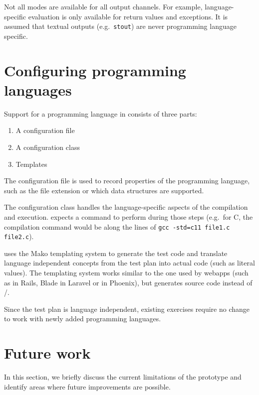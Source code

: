 \documentclass[5p,number]{elsarticle}
\begin{document}
    Not all modes are available for all output channels.
    For example, language-specific evaluation is only available for return values and exceptions.
    It is assumed that textual outputs (e.g.\ \texttt{stout}) are never programming language specific.

    \section{Configuring programming languages}\label{sec:configuring-programming-languages}

    Support for a programming language in \tested{} consists of three parts:

    \begin{enumerate}
        \item A configuration file
        \item A configuration class
        \item Templates
    \end{enumerate}

    The configuration file is used to record properties of the programming language, such as the file extension or which data structures are supported.

    The configuration class handles the language-specific aspects of the compilation and execution.
    \tested{} expects a command to perform during those steps (e.g.\ for C, the compilation command would be along the lines of \texttt{gcc -std=c11 file1.c file2.c}).
    
    \tested{} uses the Mako templating system \cite{mako} to generate the test code and translate language independent concepts from the test plan into actual code (such as literal values).
    The templating system works similar to the one used by webapps (such as  in Rails, Blade in Laravel or  in Phoenix), but generates source code instead of /.
    
    Since the test plan is language independent, existing exercises require no change to work with newly added programming languages.
    
    \section{Future work}\label{sec:future-work}
    
    In this section, we briefly discuss the current limitations of the prototype and identify areas where future improvements are possible.
    
\end{document}

